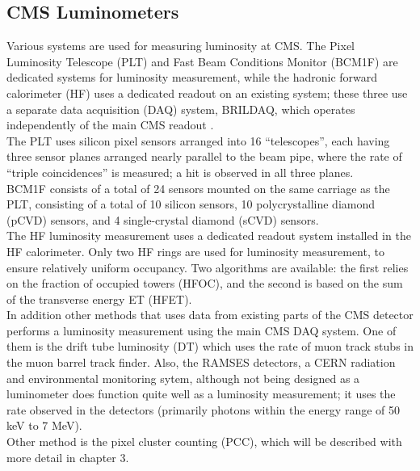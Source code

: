 \subsection{CMS Luminometers}
Various systems are used for measuring luminosity at CMS. The Pixel Luminosity Telescope (PLT) and Fast Beam Conditions Monitor (BCM1F) are dedicated systems for luminosity measurement, while the hadronic forward calorimeter (HF) uses a dedicated readout on an existing system; these three use a separate data acquisition (DAQ) system, BRILDAQ, which operates independently of the main CMS readout \cite{pas_18}.\\
The PLT uses silicon pixel sensors arranged into 16 “telescopes”, each having three sensor planes arranged nearly parallel to the beam pipe, where the rate of “triple coincidences” is measured; a hit is observed in all three planes.\\
BCM1F consists of a total of 24 sensors mounted on the same carriage as the PLT, consisting of a total of 10 silicon sensors, 10 polycrystalline diamond (pCVD) sensors, and 4 single-crystal diamond (sCVD) sensors.\\
The HF luminosity measurement uses a dedicated readout system installed in the HF calorimeter. Only two HF rings are used for luminosity measurement, to ensure relatively uniform occupancy. Two algorithms are available: the first relies on the fraction of occupied towers (HFOC), and the second is based on the sum of the transverse energy ET (HFET).\\
In addition other methods that uses data from existing parts of the CMS detector performs a luminosity measurement using the main CMS DAQ system. One of them is the drift tube luminosity (DT) which uses the rate of muon track stubs in the muon barrel track finder. Also, the RAMSES detectors, a CERN radiation and environmental monitoring sytem, although not being designed as a luminometer does function quite well as a luminosity measurement; it uses the rate observed in the detectors (primarily photons within the energy range of 50 keV to 7 MeV).\\ Other method is the pixel cluster counting (PCC), which will be described with more detail in chapter 3.
